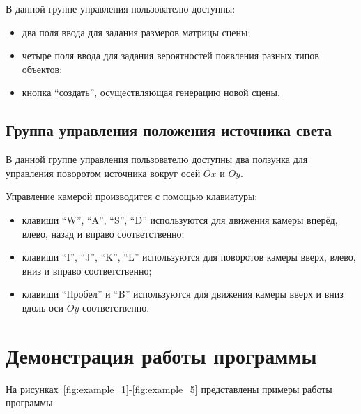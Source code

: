 В данной группе управления пользователю доступны:
\begin{itemize}
  \item два поля ввода для задания размеров матрицы сцены;
  \item четыре поля ввода для задания вероятностей появления разных типов объектов;
  \item кнопка ``создать'', осуществляющая генерацию новой сцены.
\end{itemize}

\subsection*{Группа управления положения источника света}

В данной группе управления пользователю доступны два ползунка для управления поворотом источника вокруг осей $Ox$ и $Oy$.

Управление камерой производится с помощью клавиатуры:
\begin{itemize}
  \item клавиши ``W'', ``A'', ``S'', ``D'' используются для движения камеры вперёд, влево, назад и вправо соответственно;
  \item клавиши ``I'', ``J'', ``K'', ``L'' используются для поворотов камеры вверх, влево, вниз и вправо соответственно;
  \item клавиши ``Пробел'' и ``B'' используются для движения камеры вверх и вниз вдоль оси $Oy$ соответственно.
\end{itemize}



\section{Демонстрация работы программы}

На рисунках~\ref{fig:example_1}-\ref{fig:example_5} представлены примеры работы программы.

